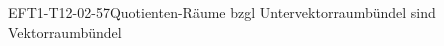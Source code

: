 
\begin{REM}{EFT1-T12-02-57}{Quotienten-Räume bzgl Untervektorraumbündel sind Vektorraumbündel}
\end{REM}
